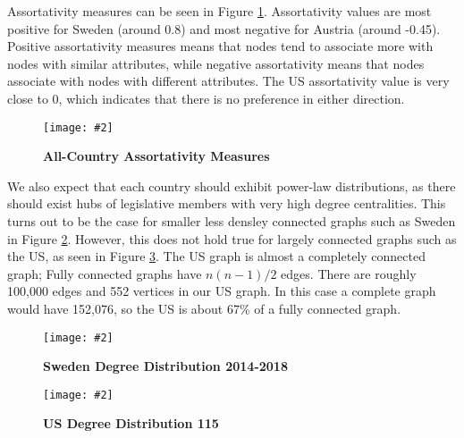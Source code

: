 \documentclass[12pt]{article}
\newcommand{\image}[4][0.6]{
  \begin{figure}[H]
    \centering
    \texttt{[image: \#2]}
    \begin{center}
      \caption[(details)]{\textbf{#4}\label{fig:#3}}
    \end{center}
    \vspace{-2.5em}
  \end{figure}}
\begin{document}
\begin{multicols*}{2}

Assortativity measures can be seen in Figure \ref{fig:ass}. Assortativity values are most positive for Sweden (around 0.8) and most negative for Austria (around -0.45). Positive assortativity measures means that nodes tend to associate more with nodes with similar attributes, while negative assortativity means that nodes associate with nodes with different attributes. The US assortativity value is very close to 0, which indicates that there is no preference in either direction. 

\image[0.3]{../plots/assortativity/all_countries.pdf}{ass}{All-Country Assortativity Measures}

We also expect that each country should exhibit power-law distributions, as there should exist hubs of legislative members with very high degree centralities. This turns out to be the case for smaller less densley connected graphs such as Sweden in Figure \ref{fig:se_deg}. However, this does not hold true for largely connected graphs such as the US, as seen in Figure \ref{fig:us_deg}. The US graph is almost a completely connected graph; Fully connected graphs have $n(n-1)/2$ edges. There are roughly 100,000 edges and 552 vertices in our US graph. In this case a complete graph would have 152,076, so the US is about 67\% of a fully connected graph.

\image[0.3]{../plots/distributions/sweden/degree/degree_net_se2014-2018.graphml.png}{se_deg}{Sweden Degree Distribution 2014-2018}
\image[0.3]{../plots/distributions/us/degree/degree_us.115.graphml.png}{us_deg}{US Degree Distribution 115}
 


\end{multicols*}
\end{document}
